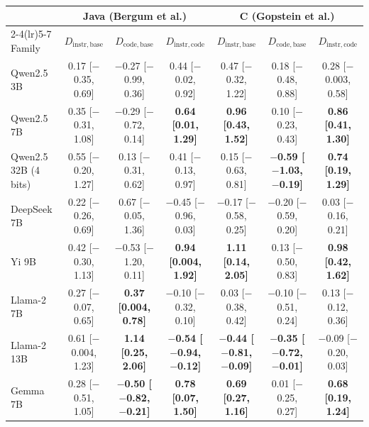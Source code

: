 {\footnotesize\setlength{\tabcolsep}{3pt}
\begin{tabular}{lcccccc}
\toprule
 & \multicolumn{3}{c}{Java (Bergum et al.)} & \multicolumn{3}{c}{C (Gopstein et al.)} \\
\cmidrule(lr){2-4}\cmidrule(lr){5-7}
Family & $D_{\mathrm{instr},\mathrm{base}}$ & $D_{\mathrm{code},\mathrm{base}}$ & $D_{\mathrm{instr},\mathrm{code}}$ & $D_{\mathrm{instr},\mathrm{base}}$ & $D_{\mathrm{code},\mathrm{base}}$ & $D_{\mathrm{instr},\mathrm{code}}$ \\
\midrule
Qwen2.5 3B & 0.17 [$-$0.35, 0.69] & $-$0.27 [$-$0.99, 0.36] & 0.44 [$-$0.02, 0.92] & 0.47 [$-$0.32, 1.22] & 0.18 [$-$0.48, 0.88] & 0.28 [$-$0.003, 0.58] \\
Qwen2.5 7B & 0.35 [$-$0.31, 1.08] & $-$0.29 [$-$0.72, 0.14] & \textbf{0.64 [0.01, 1.29]} & \textbf{0.96 [0.43, 1.52]} & 0.10 [$-$0.23, 0.43] & \textbf{0.86 [0.41, 1.30]} \\
Qwen2.5 32B (4 bits) & 0.55 [$-$0.20, 1.27] & 0.13 [$-$0.31, 0.62] & 0.41 [$-$0.13, 0.97] & 0.15 [$-$0.63, 0.81] & \textbf{$-$0.59 [$-$1.03, $-$0.19]} & \textbf{0.74 [0.19, 1.29]} \\
DeepSeek 7B & 0.22 [$-$0.26, 0.69] & 0.67 [$-$0.05, 1.36] & $-$0.45 [$-$0.96, 0.03] & $-$0.17 [$-$0.58, 0.25] & $-$0.20 [$-$0.59, 0.20] & 0.03 [$-$0.16, 0.21] \\
Yi 9B & 0.42 [$-$0.30, 1.13] & $-$0.53 [$-$1.20, 0.11] & \textbf{0.94 [0.004, 1.92]} & \textbf{1.11 [0.14, 2.05]} & 0.13 [$-$0.50, 0.83] & \textbf{0.98 [0.42, 1.62]} \\
Llama-2 7B & 0.27 [$-$0.07, 0.65] & \textbf{0.37 [0.004, 0.78]} & $-$0.10 [$-$0.32, 0.10] & 0.03 [$-$0.38, 0.42] & $-$0.10 [$-$0.51, 0.24] & 0.13 [$-$0.12, 0.36] \\
Llama-2 13B & 0.61 [$-$0.004, 1.23] & \textbf{1.14 [0.25, 2.06]} & \textbf{$-$0.54 [$-$0.94, $-$0.12]} & \textbf{$-$0.44 [$-$0.81, $-$0.09]} & \textbf{$-$0.35 [$-$0.72, $-$0.01]} & $-$0.09 [$-$0.20, 0.03] \\
Gemma 7B & 0.28 [$-$0.51, 1.05] & \textbf{$-$0.50 [$-$0.82, $-$0.21]} & \textbf{0.78 [0.07, 1.50]} & \textbf{0.69 [0.27, 1.16]} & 0.01 [$-$0.25, 0.27] & \textbf{0.68 [0.19, 1.24]} \\
\bottomrule
\end{tabular}}
